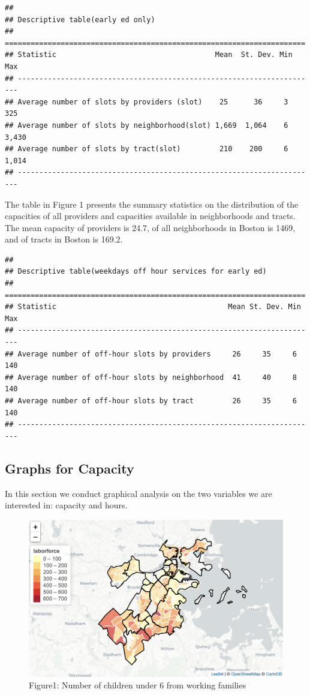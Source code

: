 \documentclass[10pt,letterpaper]{article}
\begin{document}
\begin{verbatim}
## 
## Descriptive table(early ed only)
## ======================================================================
## Statistic                                     Mean  St. Dev. Min  Max 
## ----------------------------------------------------------------------
## Average number of slots by providers (slot)    25      36     3   325 
## Average number of slots by neighborhood(slot) 1,669  1,064    6  3,430
## Average number of slots by tract(slot)         210    200     6  1,014
## ----------------------------------------------------------------------
\end{verbatim}

The table in Figure 1 presents the summary statistics on the
distribution of the capacities of all providers and capacities available
in neighborhoods and tracts. The mean capacity of providers is 24.7, of
all neighborhoods in Boston is 1469, and of tracts in Boston is 169.2.

\begin{verbatim}
## 
## Descriptive table(weekdays off hour services for early ed)
## ======================================================================
## Statistic                                        Mean St. Dev. Min Max
## ----------------------------------------------------------------------
## Average number of off-hour slots by providers     26     35     6  140
## Average number of off-hour slots by neighborhood  41     40     8  140
## Average number of off-hour slots by tract         26     35     6  140
## ----------------------------------------------------------------------
\end{verbatim}

\subsection{Graphs for Capacity}\label{graphs-for-capacity}

In this section we conduct graphical analysis on the two variables we
are interested in: capacity and hours.

\begin{figure}

{\centering \includegraphics[width=0.25\linewidth]{fig1} 

}

\caption{Figure1: Number of children under 6 from working families}\label{fig:unnamed-chunk-3}
\end{figure}
\end{document}
